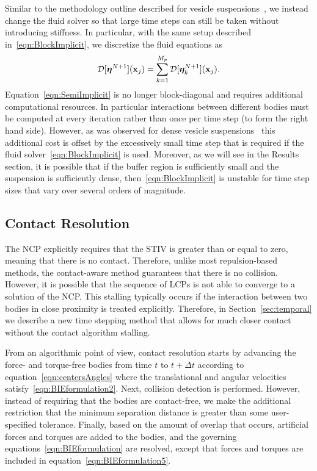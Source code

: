 \documentclass[preprint, 10pt]{elsarticle}
\begin{document}
Similar to the methodology
outline described for vesicle suspensions~\cite{Quaife2014}, we instead
change the fluid solver so that large time steps can still be taken
without introducing stiffness.  In particular, with the same setup
described in~\eqref{eqn:BlockImplicit}, we discretize the fluid
equations as
\begin{align}
  {\mathcal{D}}[{\boldsymbol\eta}^{N+1}]({\mathbf{x}}_j) = 
  \sum_{k=1}^{M_p} {\mathcal{D}}[{\boldsymbol\eta}^{N+1}_k]({\mathbf{x}}_j).
  \label{eqn:SemiImplicit}
\end{align}
Equation~\eqref{eqn:SemiImplicit} is no longer block-diagonal and requires additional computational
resources. In particular
interactions between different bodies must be computed at every
iteration rather than once per time step (to form the right hand side).
However, as was observed for dense vesicle suspensions~\cite{Quaife2014, Rahimian2015} this
additional cost is offset by the
excessively small time step that is required if the fluid
solver~\eqref{eqn:BlockImplicit} is used.  Moreover, as we will see in
the Results section, it is possible that if the buffer region is
sufficiently small and the suspension is sufficiently dense,
then~\eqref{eqn:BlockImplicit} is unstable for time step sizes that vary
over several orders of magnitude.

\subsection{Contact Resolution}
\label{sec:contact}
The NCP explicitly requires that the STIV is greater than or equal to zero, meaning that there is
no contact.  Therefore, unlike most repulsion-based methods, the
contact-aware method guarantees that there is no collision.  However, it
is possible that the sequence of LCPs is not able to converge to a
solution of the NCP.  This stalling typically occurs if the interaction
between two bodies in close proximity is treated explicitly.
Therefore, in Section~\ref{sec:temporal} we describe a new time stepping
method that allows for much closer contact without the contact algorithm
stalling.


From an algorithmic point of view, contact resolution starts by
advancing the force- and torque-free bodies from time $t$ to $t +
\Delta t$ according to equation~\eqref{eqn:centersAngles} where the
translational and angular velocities satisfy~\eqref{eqn:BIEformulation2}.
Next, collision detection is performed.  However, instead of requiring
that the bodies are contact-free, we make the additional restriction
that the minimum separation distance is greater than some user-specified
tolerance.  Finally, based on the amount of overlap that occurs,
artificial forces and torques are added to the bodies, and the governing
equations~\eqref{eqn:BIEformulation} are resolved, except that forces
and torques are included in equation~\eqref{eqn:BIEformulation5}.  
\end{document}
